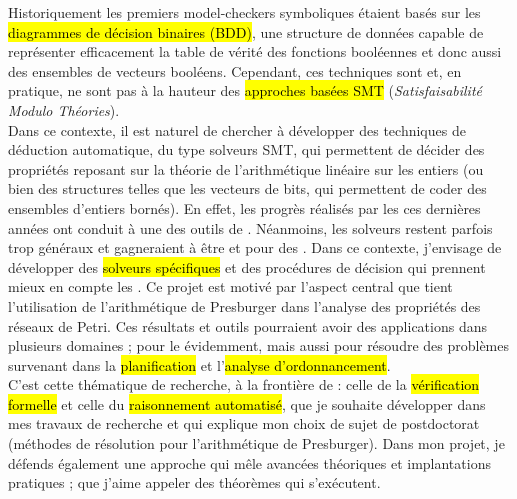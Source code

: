 Historiquement les premiers model-checkers symboliques étaient basés sur les
\hl{diagrammes de décision binaires (BDD)}, une structure de données capable de
représenter efficacement la table de vérité des fonctions booléennes et donc
aussi des ensembles de vecteurs booléens. Cependant, ces techniques sont
 et, en pratique, ne sont pas à la hauteur des
\hl{approches basées SMT} (\emph{Satisfaisabilité Modulo Théories}).\\

Dans ce contexte, il est naturel de chercher à développer des techniques de
déduction automatique, du type solveurs SMT, qui permettent de décider des
propriétés reposant sur la théorie de l'arithmétique linéaire sur les entiers
(ou bien des structures telles que les vecteurs de bits, qui permettent de coder
des ensembles d'entiers bornés).
En effet, les progrès réalisés par les  ces dernières années
ont conduit à une  des outils de .
Néanmoins, les solveurs restent parfois trop généraux et gagneraient à être
 et  pour des . Dans ce
contexte, j'envisage de développer des \hl{solveurs spécifiques} et des
procédures de décision qui prennent mieux en compte les . Ce projet est motivé par l'aspect central que tient l'utilisation de
l'arithmétique de Presburger dans l'analyse des propriétés des réseaux de Petri.
Ces résultats et outils pourraient avoir des applications dans plusieurs
domaines ; pour le  évidemment, mais aussi pour résoudre des
problèmes survenant dans la \hl{planification} et l'\hl{analyse
d'ordonnancement}.\\

C'est cette thématique de recherche, à la frontière de  :
celle de la \hl{vérification formelle} et celle du \hl{raisonnement automatisé},
que je souhaite développer dans mes travaux de recherche et qui explique mon
choix de sujet de postdoctorat (méthodes de résolution pour l'arithmétique de
Presburger). Dans mon projet, je défends également une approche qui mêle
avancées théoriques et implantations pratiques ; que j'aime appeler des \og
théorèmes qui s'exécutent\fg.





